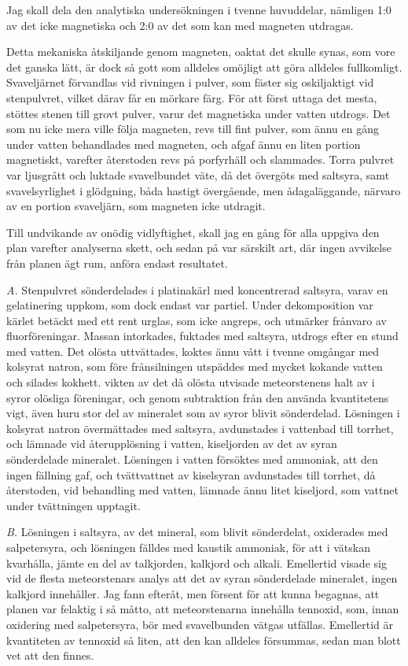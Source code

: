 \documentclass[a4paper, 12pt, oneside, swedish]{article}
\begin{document}
Jag skall dela den analytiska undersökningen i tvenne huvuddelar, nämligen 1:0 av det icke magnetiska och 2:0 av det som kan med magneten utdragas.

Detta mekaniska åtskiljande genom magneten, oaktat det skulle synas, som vore det ganska lätt, är dock så gott som alldeles omöjligt att göra alldeles fullkomligt. Svaveljärnet förvandlas vid rivningen i pulver, som fäster sig oskiljaktigt vid stenpulvret, vilket därav får en mörkare färg. För att först uttaga det mesta, stöttes stenen till grovt pulver, varur det magnetiska under vatten utdrogs. Det som nu icke mera ville följa magneten, revs till fint pulver, som ännu en gång under vatten behandlades med magneten, och afgaf ännu en liten portion magnetiskt, varefter återstoden revs på porfyrhäll och slammades. Torra pulvret var ljusgrått och luktade svavelbundet väte, då det övergöts med saltsyra, samt svavelsyrlighet i glödgning, båda hastigt övergående, men ådagaläggande, närvaro av en portion svaveljärn, som magneten icke utdragit.

Till undvikande av onödig vidlyftighet, skall jag en gång för alla uppgiva den plan varefter analyserna skett, och sedan på var särskilt art, där ingen avvikelse från planen ägt rum, anföra endast resultatet.

\emph{A.} Stenpulvret sönderdelades i platinakärl med koncentrerad saltsyra, varav en gelatinering uppkom, som dock endast var partiel. Under dekomposition var kärlet betäckt med ett rent urglas, som icke angreps, och utmärker frånvaro av fluorföreningar. Massan intorkades, fuktades med saltsyra, utdrogs efter en stund med vatten. Det olösta uttvättades, koktes ännu vått i tvenne omgångar med kolsyrat natron, som före frånsilningen utspäddes med mycket kokande vatten och silades kokhett. vikten av det då olösta utvisade meteorstenens halt av i syror olösliga föreningar, och genom subtraktion från den använda kvantitetens vigt, även huru stor del av mineralet som av syror blivit sönderdelad. Lösningen i kolsyrat natron övermättades med saltsyra, avdunstades i vattenbad till torrhet, och lämnade vid återupplösning i vatten, kiseljorden av det av syran sönderdelade mineralet. Lösningen i vatten försöktes med ammoniak, att den ingen fällning gaf, och tvättvattnet av kiselsyran avdunstades till torrhet, då återstoden, vid behandling med vatten, lämnade ännu litet kiseljord, som vattnet under tvättningen upptagit.

\emph{B.} Lösningen i saltsyra, av det mineral, som blivit sönderdelat, oxiderades med salpetersyra, och lösningen fälldes med kaustik ammoniak, för att i vätskan kvarhålla, jämte en del av talkjorden, kalkjord och alkali. Emellertid visade sig vid de flesta meteorstenars analys att det av syran sönderdelade mineralet, ingen kalkjord innehåller. Jag fann efteråt, men försent för att kunna begagnas, att planen var felaktig i så måtto, att meteorstenarna innehålla tennoxid, som, innan oxidering med salpetersyra, bör med svavelbunden vätgas utfällas. Emellertid är kvantiteten av tennoxid så liten, att den kan alldeles försummas, sedan man blott vet att den finnes.
\end{document}
